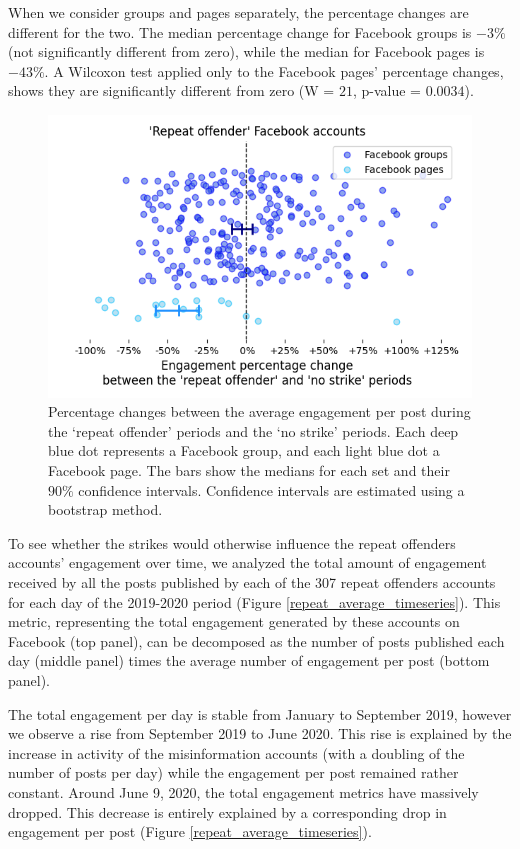 \documentclass[11pt,a4paper]{article}
\begin{document}
When we consider groups and pages separately, the percentage changes are different for the two. 
The median percentage change for Facebook groups is $-3\%$ (not significantly different from zero), while the median for Facebook pages is $-43\%$. 
A Wilcoxon test applied only to the Facebook pages' percentage changes, shows they are significantly different from zero (W = $21$, p-value = $0.0034$).

\begin{figure}[!h]
\centering
\includegraphics[width=\linewidth]{./../figure/repeat_vs_free_percentage_change.png}
\caption{Percentage changes between the average engagement per post during the `repeat offender' periods and the `no strike' periods. 
Each deep blue dot represents a Facebook group, and each light blue dot a Facebook page.
The bars show the medians for each set and their $90\%$ confidence intervals.
Confidence intervals are estimated using a bootstrap method.}
\label{repeat_vs_free_percentage_change}
\end{figure}

To see whether the strikes would otherwise influence the repeat offenders accounts' engagement over time, we analyzed the total amount of engagement received by all the posts published by each of the 307 repeat offenders accounts for each day of the 2019-2020 period (Figure \ref{repeat_average_timeseries}). 
This metric, representing the total engagement generated by these accounts on Facebook (top panel), can be decomposed as the number of posts published each day (middle panel) times the average number of engagement per post (bottom panel).

The total engagement per day is stable from January to September 2019, however we observe a rise from September 2019 to June 2020. 
This rise is explained by the increase in activity of the misinformation accounts (with a doubling of the number of posts per day) while the engagement per post remained rather constant.
Around June 9, 2020, the total engagement metrics have massively dropped.
This decrease is entirely explained by a corresponding drop in engagement per post (Figure \ref{repeat_average_timeseries}).
\end{document}
